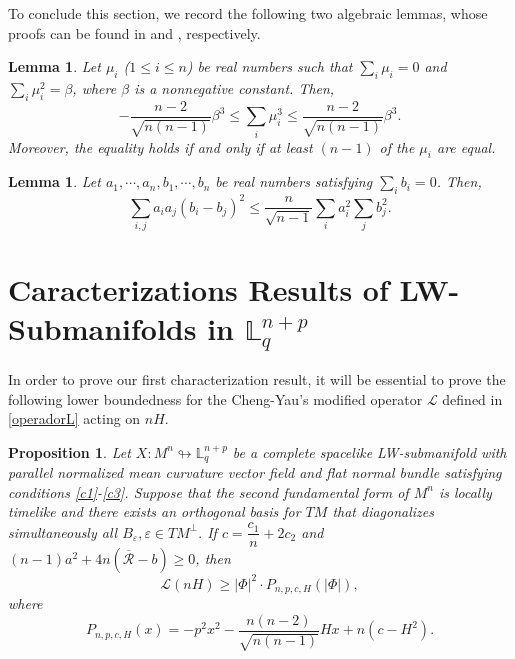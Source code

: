 \documentclass[leqno,11pt]{amsart}
\theoremstyle{plain}
\newtheorem{lemma}[theorem]{\indent\sc Lemma}
\newtheorem{proposition}[theorem]{\indent\sc Proposition}
\theoremstyle{definition}
\numberwithin{equation}{section}
\begin{document}
To conclude this section, we record the following two algebraic lemmas, whose proofs can be found in \cite{Okumura:74} and \cite{Zhang:05}, respectively.

\begin{lemma}\label{lemma 3}
Let $\mu_i$ ($1\leq i\leq n$) be real numbers such that $\displaystyle\sum_i\mu_i=0$ and $\displaystyle\sum_i\mu_i^2=\beta$, where $\beta$ is a nonnegative constant. Then,
\begin{equation*}
-\frac{n-2}{\sqrt{n(n-1)}}\beta^3\leq\sum_i\mu_i^3\leq\frac{n-2}{\sqrt{n(n-1)}}\beta^3.
\end{equation*}
Moreover, the equality holds if and only if at least $(n-1)$ of the $\mu_i$ are equal.
\end{lemma}

\begin{lemma}\label{lemma 4}
Let $a_1,\cdots,a_n,b_1,\cdots,b_n$ be real numbers satisfying $\displaystyle\sum_ib_i=0$. Then,
\begin{equation*}
\sum_{i,j}a_ia_j(b_i-b_j)^2\leq\frac{n}{\sqrt{n-1}}\sum_ia_i^2\sum_jb_j^2.
\end{equation*}
\end{lemma}


\section{Caracterizations Results of LW-Submanifolds in $\mathbb{L}^{n+p}_q$}\label{sec:main result}

In order to prove our first characterization result, it will be essential to prove the following lower boundedness for the Cheng-Yau's modified operator $\mathcal{L}$ defined in \eqref{operadorL} acting on $nH$.

\begin{proposition}
Let $X:M^n\looparrowright \mathbb{L}^{n+p}_{q}$ be a complete spacelike LW-submanifold with parallel normalized mean curvature vector field and flat normal bundle satisfying conditions \eqref{c1}-\eqref{c3}. Suppose that the second fundamental form of $M^n$ is locally timelike and there exists an orthogonal basis for $TM$ that diagonalizes simultaneously all $B_{\varepsilon},
\varepsilon\in TM^{\perp}.$ If $c=\dfrac{c_1}{n}+2c_2$ and
$(n-1)a^2+4n(\overline{\mathcal{R}}-b)\geq 0$,
then
\begin{equation}\label{hip_1_prop}
\mathcal{L}(nH)\geq |\Phi|^2\cdot P_{n,p,c,H}(|\Phi|),
\end{equation}
where 
\begin{equation}\label{hip_2_prop}
P_{n,p,c,H}(x)=-p^2x^2-\dfrac{n(n-2)}{\sqrt{n(n-1)}}Hx+n(c-H^2).
\end{equation}
\end{proposition}
\end{document}
